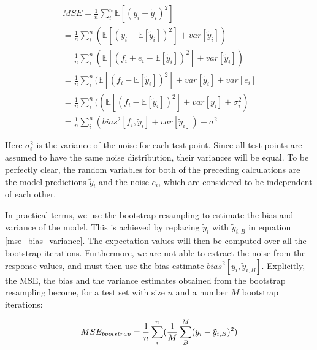 \documentclass[reprint, english, nofootinbib]{revtex4-2}
\begin{document}
        \begin{equation}
        \label{mse_bias_variance}
        \begin{split}
        MSE = \frac{1}{n} \sum^{n}_{i} \mathbb{E} [(y_{i} - \tilde{y}_{i})^2]  \\
        = \frac{1}{n} \sum^{n}_{i} (\mathbb{E}[(y_{i} - \mathbb{E}[\tilde{y}_{i}])^2]+var[\tilde{y}_{i}]) \\
        = \frac{1}{n} \sum^{n}_{i} (\mathbb{E}[(f_{i} + e_{i} - \mathbb{E}[\tilde{y}_{i}])^2] + var[\tilde{y}_{i}]) \\
        = \frac{1}{n} \sum^{n}_{i} (\mathbb{E}[(f_{i} - \mathbb{E}[\tilde{y}_{i}])^2] + var[\tilde{y}_{i}] + var[e_{i}] \\
        = \frac{1}{n} \sum^{n}_{i} ((\mathbb{E}[(f_{i} - \mathbb{E}[\tilde{y}_{i}])^2] + var[\tilde{y}_{i}] + \sigma_{i}^2) \\
        =  \frac{1}{n} \sum^{n}_{i} (bias^2[f_i,\tilde{y}_{i}] + var[\tilde{y}_{i}]) + \sigma^2
        \end{split}
        \end{equation}

        Here $\sigma_{i}^2$ is the variance of the noise for each test point. Since all test points are assumed to have the same noise distribution, their variances will be equal.  To be perfectly clear, the random variables for both of the preceding calculations are the model predictions $\tilde{y}_{i}$ and the noise $e_{i}$, which are considered to be independent of each other.

        In practical terms, we use the bootstrap resampling to estimate the bias and variance of the model. This is achieved by replacing $\tilde{y}_{i}$ with $\tilde{y}_{i,B}$ in equation \ref{mse_bias_variance}. The expectation values will then be computed over all the bootstrap iterations. Furthermore, we are not able to extract the noise from the response values, and must then use the bias estimate $bias^2[y_{i},\tilde{y}_{i,B}]$. Explicitly, the MSE, the bias and the variance estimates obtained from the bootstrap resampling become, for a test set with size $n$ and a number $M$ bootstrap iterations:

        \begin{equation}
        \label{bootstrap_mse}
        MSE_{bootstrap} = \frac{1}{n} \sum^{n}_{i} (\frac{1}{M}\sum^{M}_{B} (y_{i} - \tilde{y}_{i,B})^2)  \\
        \end{equation}
\end{document}
